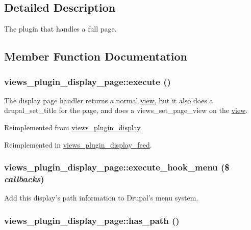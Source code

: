 \subsection{Detailed Description}
The plugin that handles a full page. 

\subsection{Member Function Documentation}
\hypertarget{classviews__plugin__display__page_943b71fc873e5d09f548b69ba314b674}{
\subsubsection[{execute}]{\setlength{\rightskip}{0pt plus 5cm}views\_\-plugin\_\-display\_\-page::execute ()}}
\label{classviews__plugin__display__page_943b71fc873e5d09f548b69ba314b674}


The display page handler returns a normal \hyperlink{classview}{view}, but it also does a drupal\_\-set\_\-title for the page, and does a views\_\-set\_\-page\_\-view on the \hyperlink{classview}{view}. 

Reimplemented from \hyperlink{classviews__plugin__display_f99c4a303d3e409ab7b14c6cfcd3a1d8}{views\_\-plugin\_\-display}.

Reimplemented in \hyperlink{classviews__plugin__display__feed_6bfa566313f3f8fba85751554567e2dd}{views\_\-plugin\_\-display\_\-feed}.\hypertarget{classviews__plugin__display__page_92137bfe76641bd6c50e7d8b81108b91}{
\subsubsection[{execute\_\-hook\_\-menu}]{\setlength{\rightskip}{0pt plus 5cm}views\_\-plugin\_\-display\_\-page::execute\_\-hook\_\-menu (\$ {\em callbacks})}}
\label{classviews__plugin__display__page_92137bfe76641bd6c50e7d8b81108b91}


Add this display's path information to Drupal's menu system. \hypertarget{classviews__plugin__display__page_6ab3df375279fc7308aea96e3f08f833}{
\subsubsection[{has\_\-path}]{\setlength{\rightskip}{0pt plus 5cm}views\_\-plugin\_\-display\_\-page::has\_\-path ()}}
\label{classviews__plugin__display__page_6ab3df375279fc7308aea96e3f08f833}


